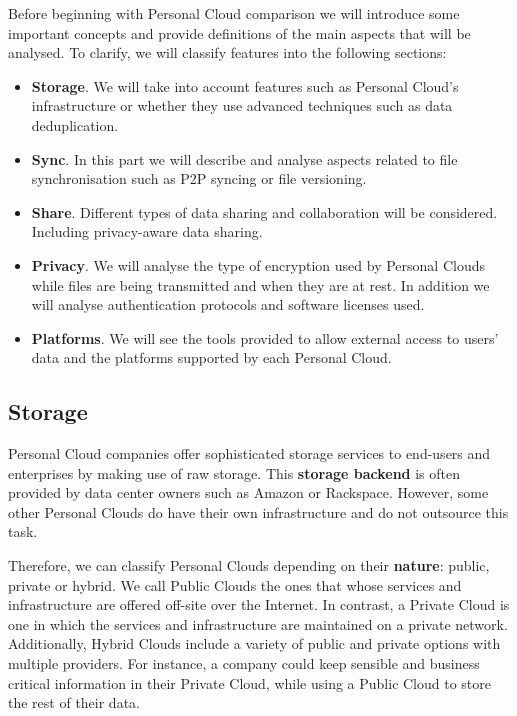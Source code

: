 Before beginning with Personal Cloud comparison we will introduce some important concepts
and provide definitions of the main aspects that will be analysed. To clarify, we will
classify features into the following sections:

\begin{itemize}
\item \textbf{Storage}. We will take into account features such as Personal Cloud's infrastructure or whether they use advanced techniques such as data deduplication.
\item \textbf{Sync}. In this part we will describe and analyse aspects related to file synchronisation such as P2P syncing or file versioning. 
\item \textbf{Share}. Different types of data sharing and collaboration will be considered. Including privacy-aware data sharing.
\item \textbf{Privacy}. We will analyse the type of encryption used by Personal Clouds while files are being transmitted and when they are at rest. In addition we will analyse authentication protocols and software licenses used.
\item \textbf{Platforms}. We will see the tools provided to allow external access to users' data and the platforms supported by each Personal Cloud.
\end{itemize}


\subsection{Storage}

Personal Cloud companies offer sophisticated storage services to end-users and enterprises by making use of raw storage. This \textbf{storage backend} is often provided by data center owners such as Amazon or Rackspace. However, some other Personal Clouds do have their own infrastructure and do not outsource this task.

Therefore, we can classify Personal Clouds depending on their \textbf{nature}: public, private or hybrid. We call Public Clouds the ones that whose services and infrastructure are offered off-site over the Internet. In contrast, a Private Cloud is one in which the services and infrastructure are maintained on a private network. Additionally, Hybrid Clouds include a variety of public and private options with multiple providers. For instance, a company could keep sensible and business critical information in their Private Cloud, while using a Public Cloud to store the rest of their data.

